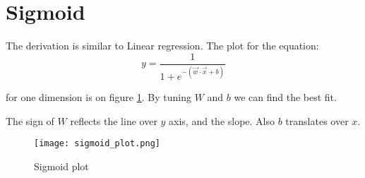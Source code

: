 \section{Sigmoid}
The derivation is similar to Linear regression. The plot for the equation:
\[
y = \frac{1}{1+e^{-(\vec{w}\cdot{}\vec{x}+b)}}
\]

for one dimension is on figure \ref{fig:sigmoid}. By tuning $W$ and $b$  we can find the best fit. 

The sign of $W$ reflects the line over $y$ axis, and the slope. Also $b$ translates over $x$.

\begin{figure}[h]
 \centering
 \texttt{[image: sigmoid\_plot.png]}
  \caption{Sigmoid plot} \label{fig:sigmoid}
\end{figure}





